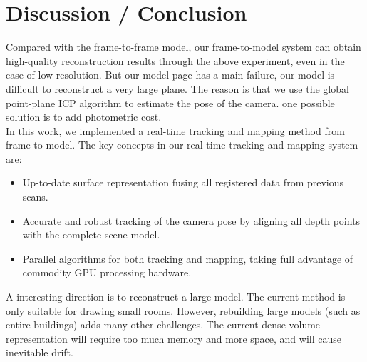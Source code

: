 \documentclass[a4paper,12pt]{article}
\begin{document}
\section{Discussion / Conclusion}
Compared with the frame-to-frame model, our frame-to-model system can obtain high-quality reconstruction results through the above experiment, even in the case of low resolution. 
But our model page has a main failure, our model is difficult to reconstruct a very large plane. The reason is that we use the global point-plane ICP algorithm to estimate the pose of the camera.
one possible solution is to add photometric cost.
\\In this work, we implemented a real-time tracking and mapping method from frame to model. The key concepts in our real-time tracking and mapping system are:
\begin{itemize}
	\item Up-to-date surface representation fusing all registered data from previous scans.
	\item Accurate and robust tracking of the camera pose by aligning all depth points with the complete scene model.
	\item Parallel algorithms for both tracking and mapping, taking full advantage of commodity GPU processing hardware.
\end{itemize}
A interesting direction is to reconstruct a large model.
The current method is only suitable for drawing small rooms. However, rebuilding large models (such as entire buildings) adds many other challenges. 
The current dense volume representation will require too much memory and more space, and will cause inevitable drift.




\end{document}
